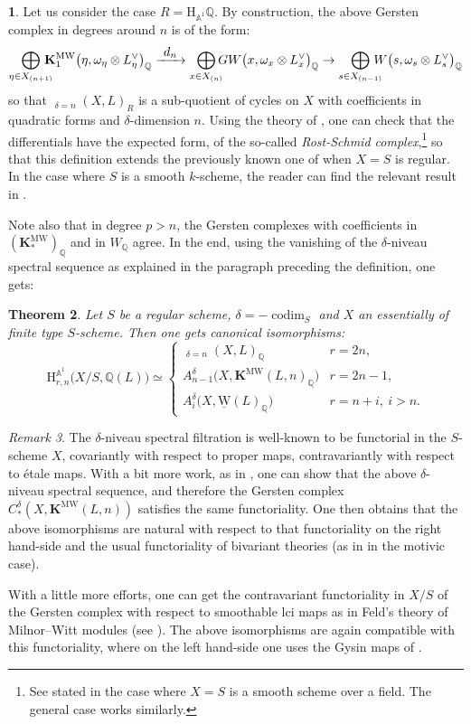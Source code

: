 \documentclass[JEP,XML,SOM,Unicode]{cedram}
\def\To#1{\mathchoice{\xrightarrow{\textstyle\kern4pt#1\kern3pt}}{\stackrel{#1}{\longrightarrow}}{}{}}
\renewcommand{\AA}{\mathbb A}
\newcommand{\KMW}{\mathbf K^\mathrm{MW}}
\newcommand{\uW}{\underline{\mathrm W}}
\newcommand{\HA}{\mathrm H_{\AA^1}}
\newcommand{\BA}{\mathrm H^{\AA^1}}
\DeclareMathOperator{\codim}{codim}
\DeclareMathOperator{\wCH}{\widetilde{CH}}
\newcommand{\QQ} {\mathbb Q}
\newtheorem{thm}{Theorem}[section]
\theoremstyle{remark}
\newtheorem{rem}[thm]{Remark}
\theoremstyle{definition}
\newtheorem{num}[thm]{}
\numberwithin{equation}{thm}
\begin{document}
\begin{num}\label{num:RostSchmid}
Let us consider the case $R=\HA \QQ$.
By construction, the above Gersten complex in degrees around $n$ is of the form:
\[
\bigoplus_{\eta \in X_{(n+1)}}\hspace*{-3mm} \KMW_1\big(\eta,\omega_\eta \otimes L_\eta^\vee\big)_\QQ
\To{d_n} \bigoplus_{x \in X_{(n)}}\hspace*{-2mm} GW\big(x,\omega_x \otimes L_x^\vee\big)_\QQ
\to \bigoplus_{s \in X_{(n-1)}}\hspace*{-3mm} W\big(s,\omega_s \otimes L_s^\vee\big)_\QQ
\]
so that $\wCH_{\delta=n}(X,L)_R$ is a sub-quotient of cycles on $X$ with coefficients
in quadratic forms and $\delta$-dimension $n$.
Using the theory of \cite{Feld2},
one can check that the \hbox{differentials} have the expected form,
of the so-called \emph{Rost-Schmid complex},\footnote{See \cite[\S 3.3]{Feld2}
stated in the case where $X=S$ is a smooth scheme over a field.
The general case works similarly.}
so that this definition extends the previously known one of \cite{Fasel_wCH} when $X=S$
is regular. In the case where $S$ is a smooth $k$-scheme, the reader can find the relevant
result in \cite[Chap.\,6, Lem.\,4.2.3]{BCDFO}.

Note also that in degree $p>n$, the Gersten complexes with coefficients in
$(\KMW_*)_\QQ$ and in $W_\QQ$ agree. In the end, using the vanishing
of the $\delta$-niveau spectral sequence as explained in the paragraph preceding the definition, one gets:
\end{num}
\begin{thm}\label{thm:biv_A1&ChowWitt}
Let $S$ be a regular scheme, $\delta=-\codim_S$ and $X$ an essentially of finite type $S$-scheme.
Then one gets canonical isomorphisms:
\[
\BA_{r,n}\big(X/S,\QQ(L)\big) \simeq
\begin{cases}
\wCH_{\delta=n}(X,L)_\QQ & r=2n, \\
A^\delta_{n-1}\big(X,\KMW(L,n)_\QQ\big) & r=2n-1, \\
A^\delta_i\big(X,\uW(L)_\QQ\big) & r=n+i,\ i>n.
\end{cases}
\]
\end{thm}

\begin{rem}\label{rem:Gersten_functoriality}
The $\delta$-niveau spectral filtration
is well-known to be functorial in the $S$-scheme $X$,
covariantly with respect to proper maps,
contravariantly with respect to étale maps.
With a bit more work, as in \cite{Jin},
one can show that the above $\delta$-niveau spectral sequence, and therefore
the Gersten complex $C_*^\delta(X,\KMW(L,n))$ satisfies the same functoriality.
One then obtains that the above isomorphisms are natural with respect to
that functoriality on the right hand-side and the usual functoriality of
bivariant theories (as in \cite{DJK} in the motivic case).

With a little more efforts, one can get the contravariant functoriality
in $X/S$ of the Gersten complex with respect to smoothable lci maps
as in Feld's theory of Milnor--Witt modules (see \cite{Feld1}).
The above isomorphisms are again compatible with this functoriality,
where on the left hand-side one uses the Gysin maps of \cite{DJK}.
\end{rem}
\end{document}
